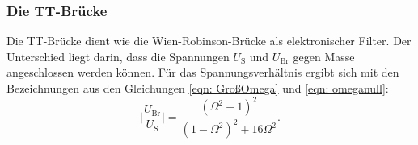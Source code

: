     \subsubsection{Die TT-Brücke}

        Die TT-Brücke dient wie die Wien-Robinson-Brücke als elektronischer Filter.
        Der Unterschied liegt darin, dass die Spannungen $U_\text{S}$ und $U_\text{Br}$ gegen Masse
        angeschlossen werden können.
        Für das Spannungsverhältnis ergibt sich mit den Bezeichnungen
        aus den Gleichungen \eqref{eqn: GroßOmega} und \eqref{eqn: omeganull}:
        \begin{equation}
            \lvert \frac{U_\text{Br}}{U_\text{S}} \rvert = \frac{(\Omega^2 - 1)^2}{(1 - \Omega^2)^2 + 16\Omega^2}.
        \end{equation}
